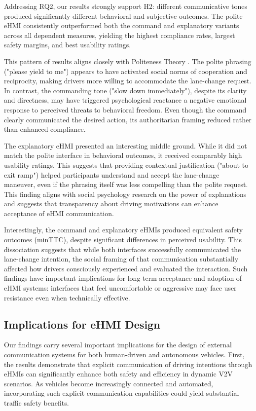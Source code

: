 \documentclass[manuscript,review]{acmart}
\begin{document}
Addressing RQ2, our results strongly support H2: different communicative tones produced significantly different behavioral and subjective outcomes. The polite eHMI consistently outperformed both the command and explanatory variants across all dependent measures, yielding the highest compliance rates, largest safety margins, and best usability ratings.

This pattern of results aligns closely with Politeness Theory \cite{brown1987politeness}. The polite phrasing ("please yield to me") appears to have activated social norms of cooperation and reciprocity, making drivers more willing to accommodate the lane-change request. In contrast, the commanding tone ("slow down immediately"), despite its clarity and directness, may have triggered psychological reactance a negative emotional response to perceived threats to behavioral freedom. Even though the command clearly communicated the desired action, its authoritarian framing reduced rather than enhanced compliance.

The explanatory eHMI presented an interesting middle ground. While it did not match the polite interface in behavioral outcomes, it received comparably high usability ratings. This suggests that providing contextual justification ("about to exit ramp") helped participants understand and accept the lane-change maneuver, even if the phrasing itself was less compelling than the polite request. This finding aligns with social psychology research on the power of explanations \cite{burger2004coincidence} and suggests that transparency about driving motivations can enhance acceptance of eHMI communication.

Interestingly, the command and explanatory eHMIs produced equivalent safety outcomes (minTTC), despite significant differences in perceived usability. This dissociation suggests that while both interfaces successfully communicated the lane-change intention, the social framing of that communication substantially affected how drivers consciously experienced and evaluated the interaction. Such findings have important implications for long-term acceptance and adoption of eHMI systems: interfaces that feel uncomfortable or aggressive may face user resistance even when technically effective.

\subsection{Implications for eHMI Design}

Our findings carry several important implications for the design of external communication systems for both human-driven and autonomous vehicles. First, the results demonstrate that explicit communication of driving intentions through eHMIs can significantly enhance both safety and efficiency in dynamic V2V scenarios. As vehicles become increasingly connected and automated, incorporating such explicit communication capabilities could yield substantial traffic safety benefits.
\end{document}
